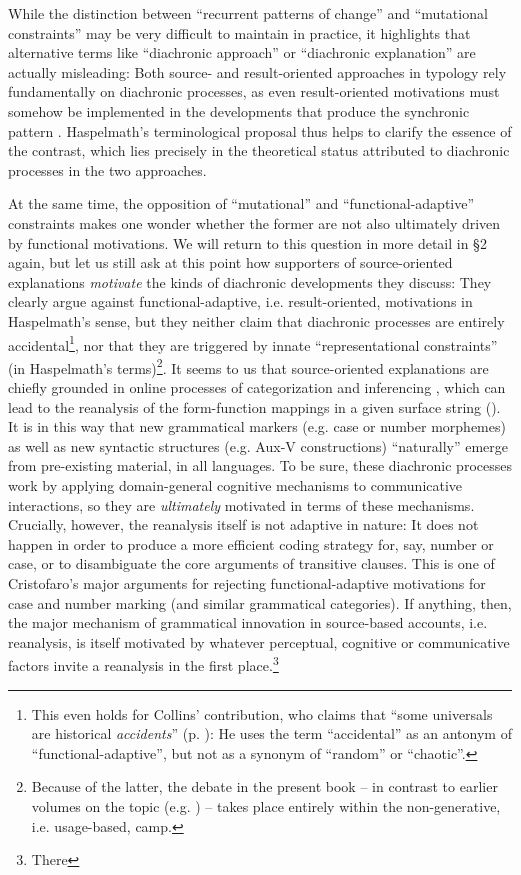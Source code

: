 \documentclass[output=paper]{langsci/langscibook}
\begin{document}
While the distinction between “recurrent patterns of change” and “mutational constraints” may be very difficult to maintain in practice, it highlights that alternative terms like “diachronic approach” or “diachronic explanation” are actually misleading: Both source- and result-oriented approaches in typology rely fundamentally on diachronic processes, as even result-oriented motivations must somehow be implemented in the developments that produce the synchronic pattern \citep{Haspelmath1999_Opt}. Haspelmath’s terminological proposal thus helps to clarify the essence of the contrast, which lies precisely in the theoretical status attributed to diachronic processes in the two approaches. 

At the same time, the opposition of “mutational” and “functional-adaptive” constraints makes one wonder whether the former are not also ultimately driven by functional motivations. We will return to this question in more detail in §2 again, but let us still ask at this point how supporters of source-oriented explanations \textit{motivate} the kinds of diachronic developments they discuss: They clearly argue against functional-adaptive, i.e. result-oriented, motivations in Haspelmath’s sense, but they neither claim that diachronic processes are entirely accidental\footnote{This even holds for Collins’ contribution, who claims that “some universals are historical \textit{accidents}” (p. \pageref{p:collins:historicalaccidents}): He uses the term “accidental” as an antonym of “functional-adaptive”, but not as a synonym of “random” or “chaotic”.}, nor that they are triggered by innate “representational constraints” (in Haspelmath’s terms)\footnote{Because of the latter, the debate in the present book – in contrast to earlier volumes on the topic (e.g. \citealt{Hawkins1988_ExplEd,Good2008_Change}) – takes place entirely within the non-generative, i.e. usage-based, camp.}. It seems to us that source-oriented explanations are chiefly grounded in online processes of categorization and inferencing \citep{Bybee2010}, which can lead to the reanalysis of the form-function mappings in a given surface string (\citealt{Croft2000,DeSmet2009}). It is in this way that new grammatical markers (e.g. case or number morphemes) as well as new syntactic structures (e.g. Aux-V constructions) “naturally” emerge from pre-existing material, in all languages. To be sure, these diachronic processes work by applying domain-general cognitive mechanisms to communicative interactions, so they are \textit{ultimately} motivated in terms of these mechanisms. Crucially, however, the reanalysis itself is not adaptive in nature: It does not happen in order to produce a more efficient coding strategy for, say, number or case, or to disambiguate the core arguments of transitive clauses. This is one of Cristofaro’s major arguments for rejecting functional-adaptive motivations for case and number marking (and similar grammatical categories). If anything, then, the major mechanism of grammatical innovation in source-based accounts, i.e. reanalysis, is itself motivated by whatever perceptual, cognitive or communicative factors invite a reanalysis in the first place.\footnote{There 
}
\end{document}
